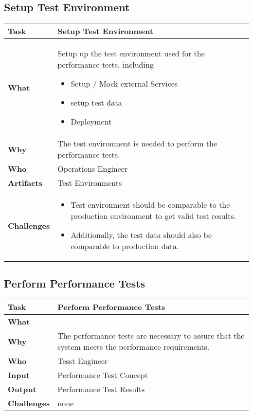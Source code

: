 \subsection{Setup Test Environment}
\begin{tabularx}{\textwidth}{@{} l X @{}}
	\caption{Setup Test Environment} \label{table:ch6_Task_Setup_Test_Environment}\\
	\toprule \bfseries Task & Setup Test Environment\\
	\midrule 
	\bfseries What & Setup up the test environment used for the performance tests, including
	\begin{itemize}
		\item Setup / Mock external Services
		\item setup test data
		\item Deployment
	\end{itemize}
	\\
	\midrule 
	\bfseries Why & The test environment is needed to perform the performance tests.\\
	\midrule 
	\bfseries Who & Operations Engineer\\
	\midrule 
	\bfseries Artifacts & Test Environments\\
	\midrule 
	\bfseries Challenges & 
	\begin{itemize}
		\item Test environment should be comparable to the production environment to get valid test results.
		\item Additionally, the test data should also be comparable to production data.
	\end{itemize}
	\\
	\bottomrule
\end{tabularx}


\subsection{Perform Performance Tests}
\begin{tabularx}{\textwidth}{@{} l X @{}}
	\caption{Perform Performance Tests} \label{table:ch6_Task_Perform_Performance_Tests}\\
	\toprule 
	\bfseries Task & Perform Performance Tests\\
	\midrule 
	\bfseries What & \\
	\midrule 
	\bfseries Why & The performance tests are necessary to assure that the system meets the performance requirements.\\
	\midrule 
	\bfseries Who & Tesst Engineer\\
	\midrule 
	\bfseries Input & Performance Test Concept\\
	\midrule 
	\bfseries Output & Performance Test Results\\
	\midrule 
	\bfseries Challenges & none\\
	\bottomrule 
\end{tabularx}



